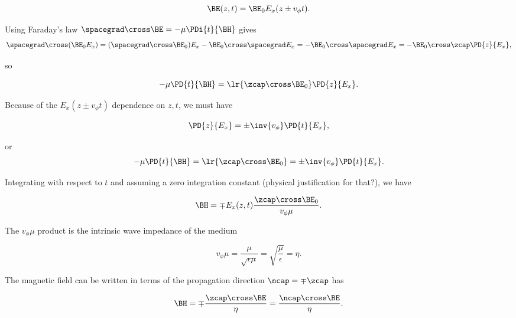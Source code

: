 \begin{equation}\label{eqn:uwavesLecture2:360}
\BE(z, t) = \BE_0 E_x( z \pm v_\phi t).
\end{equation}

Using Faraday's law \( \spacegrad \cross \BE = -\mu \PDi{t}{\BH} \) gives
\begin{dmath}\label{eqn:uwavesLecture2:380}
\spacegrad \cross (\BE_0 E_x)
=
(\spacegrad \cross \BE_0) E_x
-\BE_0 \cross \spacegrad E_x
=
-\BE_0 \cross \spacegrad E_x
=
-\BE_0 \cross \zcap \PD{z}{E_x},
\end{dmath}

so

\begin{dmath}\label{eqn:uwavesLecture2:460}
-\mu \PD{t}{\BH} = 
\lr{ \zcap \cross \BE_0 } \PD{z}{E_x}.
\end{dmath}

Because of the \( E_x( z \pm v_\phi t ) \) dependence on \( z, t \), we must have

\begin{dmath}\label{eqn:uwavesLecture2:480}
\PD{z}{E_x} = \pm \inv{v_\phi} \PD{t}{E_x},
\end{dmath}

or
\begin{dmath}\label{eqn:uwavesLecture2:500}
-\mu \PD{t}{\BH} = 
\lr{ \zcap \cross \BE_0 } 
= \pm \inv{v_\phi} \PD{t}{E_x}.
\end{dmath}

Integrating with respect to \( t \) and assuming a zero integration constant (physical justification for that?), we have

\begin{dmath}\label{eqn:uwavesLecture2:520}
\BH = \mp E_x(z, t) \frac{\zcap \cross \BE_0}{v_\phi \mu}.
\end{dmath}

The \( v_\phi \mu \) product is the intrinsic wave impedance of the medium

\begin{dmath}\label{eqn:uwavesLecture2:540}
v_\phi \mu = \frac{\mu}{\sqrt{\epsilon\mu}} = \sqrt{\frac{\mu}{\epsilon}} = \eta.
\end{dmath}

The magnetic field can be written in terms of the propagation direction \( \ncap = \mp \zcap \) has

\begin{equation}\label{eqn:uwavesLecture2:560}
\BH 
= \mp \frac{\zcap \cross \BE}{\eta}
= \frac{\ncap \cross \BE}{\eta}.
\end{equation}

